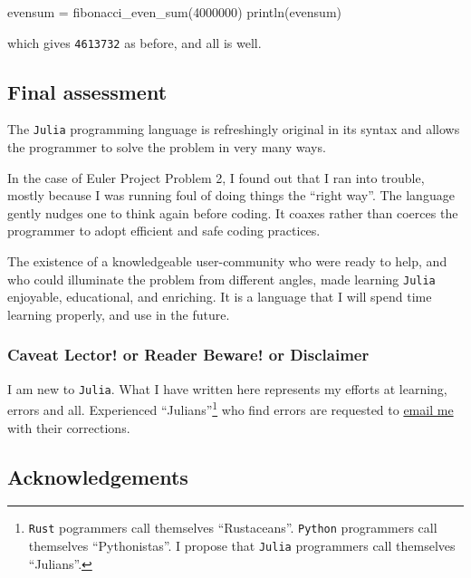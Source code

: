 \documentclass[
  a4paper,
]{article}
\newenvironment{Shaded}{\begin{snugshade}}{\end{snugshade}}
\newcommand{\FloatTok}[1]{\textcolor[rgb]{0.75,0.75,0.82}{#1}}
\newcommand{\FunctionTok}[1]{\textcolor[rgb]{0.94,0.94,0.56}{#1}}
\newcommand{\NormalTok}[1]{\textcolor[rgb]{0.80,0.80,0.80}{#1}}
\newcommand{\OperatorTok}[1]{\textcolor[rgb]{0.94,0.94,0.82}{#1}}
\begin{document}
\begin{Shaded}
\begin{Highlighting}[]
\NormalTok{evensum }\OperatorTok{=} \FunctionTok{fibonacci\_even\_sum}\NormalTok{(}\FloatTok{4000000}\NormalTok{)}
\FunctionTok{println}\NormalTok{(evensum)}
\end{Highlighting}
\end{Shaded}

which gives \texttt{4613732} as before, and all is well.

\hypertarget{final-assessment}{%
\subsection{Final assessment}\label{final-assessment}}

The \texttt{Julia} programming language is refreshingly original in its
syntax and allows the programmer to solve the problem in very many ways.

In the case of Euler Project Problem 2, I found out that I ran into
trouble, mostly because I was running foul of doing things the ``right
way''. The language gently nudges one to think again before coding. It
coaxes rather than coerces the programmer to adopt efficient and safe
coding practices.

The existence of a knowledgeable user-community who were ready to help,
and who could illuminate the problem from different angles, made
learning \texttt{Julia} enjoyable, educational, and enriching. It is a
language that I will spend time learning properly, and use in the
future.

\hypertarget{caveat-lector-or-reader-beware-or-disclaimer}{%
\subsubsection{Caveat Lector! or Reader Beware! or
Disclaimer}\label{caveat-lector-or-reader-beware-or-disclaimer}}

I am new to \texttt{Julia}. What I have written here represents my
efforts at learning, errors and all. Experienced ``Julians''\footnote{\texttt{Rust}
  pogrammers call themselves ``Rustaceans''. \texttt{Python} programmers
  call themselves ``Pythonistas''. I propose that \texttt{Julia}
  programmers call themselves ``Julians''.} who find errors are
requested to \href{mailto:feedback.swanlotus@gmail.com}{email me} with
their corrections.  \normalfont

\hypertarget{acknowledgements}{%
\subsection{Acknowledgements}\label{acknowledgements}}
\end{document}
